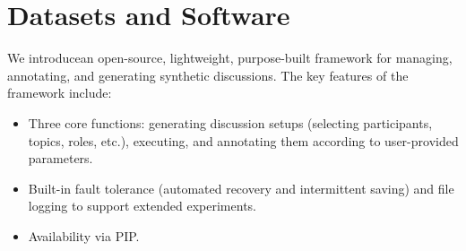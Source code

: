 \section{Datasets and Software}
\label{sec:data-soft}

We introduce\syndisco\syndiscolink an open-source, lightweight, purpose-built framework for managing, annotating, and generating synthetic discussions. The key features of the framework include: 
\begin{itemize}[nosep, noitemsep]
    \item Three core functions: generating discussion setups (selecting participants, topics, roles, etc.), executing, and annotating them according to user-provided parameters.
    \item  Built-in fault tolerance (automated recovery and intermittent saving) and file logging to support extended experiments.
    \item Availability via PIP\pip.
\end{itemize}
